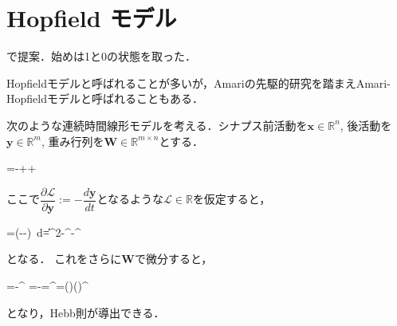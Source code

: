 \section{Hopfield モデル}


\cite{Hopfield1982-vu}で提案．始めは1と0の状態を取った．

Hopfieldモデルと呼ばれることが多いが，Amariの先駆的研究\cite{Amari1972-fq}を踏まえAmari-Hopfieldモデルと呼ばれることもある．

次のような連続時間線形モデルを考える．シナプス前活動を$\mathbf{x}\in \mathbb{R}^n$, 後活動を$\mathbf{y}\in \mathbb{R}^m$, 重み行列を$\mathbf{W}\in \mathbb{R}^{m\times n}$とする．


=-++


ここで$\dfrac{\partial\mathcal{L}}{\partial\mathbf{y}}:=-\dfrac{d\mathbf{y}}{dt}$となるような$\mathcal{L}\in \mathbb{R}$を仮定すると，


=\int \left(--\right)\ d=\|\|^2-^\top {}-^\top {}


となる． これをさらに$\mathbf{W}$で微分すると，


=-^\top\Rightarrow
{}=-=^\top=()\cdot ()^\top


となり，Hebb則が導出できる．
